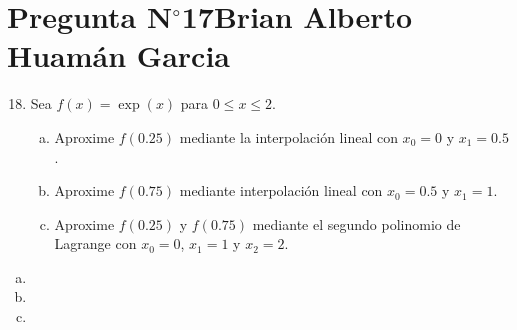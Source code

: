 \section{Pregunta N$^{\circ}$17\qquad Brian Alberto Huamán Garcia}

\begin{frame}
	\begin{enumerate}\setcounter{enumi}{17}
		\item

		      Sea
		      \begin{math}
			      f\left(x\right)=
			      \exp\left(x\right)
		      \end{math}
		      para $0\leq x\leq 2$.

		      \begin{enumerate}[a)]
			      \item

			            Aproxime $f\left(0.25\right)$ mediante la
			            interpolación lineal con $x_{0}=0$ y $x_{1}=0.5$.

			      \item

			            Aproxime $f\left(0.75\right)$ mediante
			            interpolación lineal con $x_{0}=0.5$ y $x_{1}=1$.

			      \item

			            Aproxime $f\left(0.25\right)$ y
			            $f\left(0.75\right)$ mediante el segundo polinomio
			            de Lagrange con $x_{0}=0$, $x_{1}=1$ y $x_{2}=2$.
		      \end{enumerate}
	\end{enumerate}

	\begin{solution}
		\begin{enumerate}[a)]
			\item

			\item

			\item
		\end{enumerate}
	\end{solution}
\end{frame}
